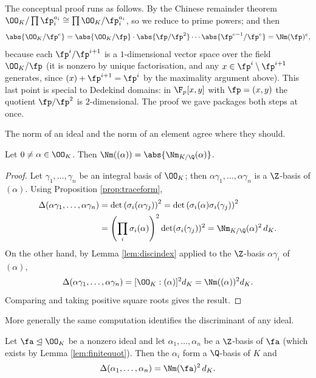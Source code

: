 \begin{remark}
	The conceptual proof runs as follows. By the Chinese remainder theorem $\OO_K/\prod\fp_i^{a_i} \cong \prod \OO_K/\fp_i^{a_i}$, so we reduce to prime powers; and then
	$$\abs{\OO_K/\fp^e} = \abs{\OO_K/\fp}\cdot\abs{\fp/\fp^2}\cdots\abs{\fp^{e-1}/\fp^e} = \Nm(\fp)^e,$$
	because each $\fp^i/\fp^{i+1}$ is a $1$-dimensional vector space over the field $\OO_K/\fp$ (it is nonzero by unique factorisation, and any $x \in \fp^i \setminus \fp^{i+1}$ generates, since $(x)+\fp^{i+1} = \fp^i$ by the maximality argument above). This last point is special to Dedekind domains: in $\F_p[x,y]$ with $\fp = (x,y)$ the quotient $\fp/\fp^2$ is $2$-dimensional. The proof we gave packages both steps at once.
\end{remark}

The norm of an ideal and the norm of an element agree where they should.

\begin{lemma}\label{lem:normprincipal}
	Let $0 \neq \alpha \in \OO_K$. Then $\Nm((\alpha)) = \abs{\Nm_{K/\Q}(\alpha)}$.
\end{lemma}

\begin{proof}
	Let $\gamma_1, \dots, \gamma_n$ be an integral basis of $\OO_K$; then $\alpha\gamma_1, \dots, \alpha\gamma_n$ is a $\Z$-basis of $(\alpha)$. Using Proposition \ref{prop:traceform},
	\begin{align*}
		\Delta(\alpha\gamma_1,\dots,\alpha\gamma_n) &= \det\left(\sigma_i(\alpha\gamma_j)\right)^2 = \det\left(\sigma_i(\alpha)\sigma_i(\gamma_j)\right)^2\\
		&= \left(\prod_i\sigma_i(\alpha)\right)^2\det(\sigma_i(\gamma_j))^2 = \Nm_{K/\Q}(\alpha)^2\, d_K.
	\end{align*}
	On the other hand, by Lemma \ref{lem:discindex} applied to the $\Z$-basis $\alpha\gamma_i$ of $(\alpha)$,
	$$\Delta(\alpha\gamma_1,\dots,\alpha\gamma_n) = [\OO_K : (\alpha)]^2 d_K = \Nm((\alpha))^2 d_K.$$
	Comparing and taking positive square roots gives the result.
\end{proof}

More generally the same computation identifies the discriminant of any ideal.

\begin{lemma}\label{lem:idealdisc}
	Let $\fa \trianglelefteq \OO_K$ be a nonzero ideal and let $\alpha_1, \dots, \alpha_n$ be a $\Z$-basis of $\fa$ (which exists by Lemma \ref{lem:finitequot}). Then the $\alpha_i$ form a $\Q$-basis of $K$ and
	$$\Delta(\alpha_1, \dots, \alpha_n) = \Nm(\fa)^2\, d_K.$$
\end{lemma}

